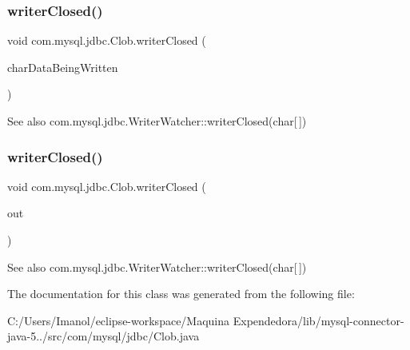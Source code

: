 \subsubsection{\texorpdfstring{writer\+Closed()}{writerClosed()}\hspace{0.1cm}{\footnotesize\ttfamily [1/2]}}
{\footnotesize\ttfamily void com.\+mysql.\+jdbc.\+Clob.\+writer\+Closed (\begin{DoxyParamCaption}\item[{char \mbox{[}$\,$\mbox{]}}]{char\+Data\+Being\+Written }\end{DoxyParamCaption})}

\begin{DoxySeeAlso}{See also}
com.\+mysql.\+jdbc.\+Writer\+Watcher\+::writer\+Closed(char\mbox{[}$\,$\mbox{]}) 
\end{DoxySeeAlso}
\mbox{\label{classcom_1_1mysql_1_1jdbc_1_1_clob_a526c6cf89df8662be452f2358117a20a}} 
\subsubsection{\texorpdfstring{writer\+Closed()}{writerClosed()}\hspace{0.1cm}{\footnotesize\ttfamily [2/2]}}
{\footnotesize\ttfamily void com.\+mysql.\+jdbc.\+Clob.\+writer\+Closed (\begin{DoxyParamCaption}\item[{Watchable\+Writer}]{out }\end{DoxyParamCaption})}

\begin{DoxySeeAlso}{See also}
com.\+mysql.\+jdbc.\+Writer\+Watcher\+::writer\+Closed(char\mbox{[}$\,$\mbox{]}) 
\end{DoxySeeAlso}


The documentation for this class was generated from the following file\+:\begin{DoxyCompactItemize}
\item 
C\+:/\+Users/\+Imanol/eclipse-\/workspace/\+Maquina Expendedora/lib/mysql-\/connector-\/java-\/5../src/com/mysql/jdbc/Clob.\+java\end{DoxyCompactItemize}
